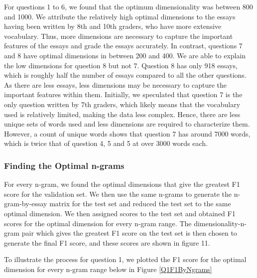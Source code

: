 \documentclass[10pt,letterpaper]{article}
\begin{document}
For questions 1 to 6, we found that the optimum dimensionality was between 800 and 1000. We attribute the relatively high optimal dimensions to the essays having been written by 8th and 10th graders, who have more extensive vocabulary. Thus, more dimensions are necessary to capture the important features of the essays and grade the essays accurately. In contrast, questions 7 and 8 have optimal dimensions in between 200 and 400. We are able to explain the low dimensions for question 8 but not 7.  Question 8 has only 918 essays, which is roughly half the number of essays compared to all the other questions. As there are less essays, less dimensions may be necessary to capture the important features within them. Initially, we speculated that question 7 is the only question written by 7th graders, which likely means that the vocabulary used is relatively limited, making the data less complex. Hence, there are less unique sets of words used and less dimensions are required to characterize them. However, a  count of unique words shows that question 7 has around 7000 words, which is twice that of question 4, 5 and 5 at over 3000 words each.

\subsubsection{Finding the Optimal n-grams}For every n-gram, we found the optimal dimensions that give the greatest F1 score for the validation set. We then use the same n-grams to generate the n-gram-by-essay matrix for the test set and reduced the test set to the same optimal dimension. We then assigned scores to the test set and obtained F1 scores for the optimal dimension for every n-gram range. The dimensionality-n-gram pair which gives the greatest F1 score on the test set is then chosen to generate the final F1 score, and these scores are shown in figure 11.

To illustrate the process for question 1, we plotted the F1 score for the optimal dimension for every n-gram range below in Figure \ref{Q1F1ByNgrams}
\end{document}
